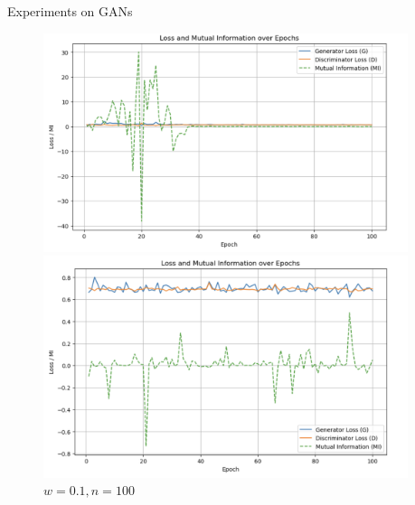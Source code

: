 \documentclass[final]{beamer}
\newlength{\sepwidth}
\newlength{\colwidth}
\newcommand{\separatorcolumn}{\begin{column}{\sepwidth}\end{column}}
\begin{document}
\begin{frame}[t]
\begin{columns}[t]
\begin{column}{\colwidth}
\begin{block}{Experiments on GANs}
    \begin{figure}
    \centering
    \begin{minipage}{0.49\textwidth}
        \centering
        \includegraphics[width=1\linewidth]{截屏2025-01-01 00.47.33.png}
        \caption{$w=0,n=100$}
    \end{minipage}
    \begin{minipage}{0.49\textwidth}
        \centering
        \includegraphics[width=1\linewidth]{截屏2025-01-01 00.47.09.png}
        \caption{$w=0.1,n=100$}
    \end{minipage}
    \end{figure}

    
        
  \end{block}

\end{column}

\separatorcolumn
\end{columns}
\end{frame}
\end{document}
